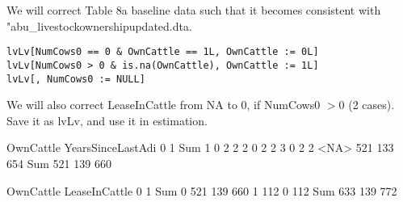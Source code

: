 	We will correct Table 8a baseline data such that it becomes consistent with \textsf{"abu\_livestockownershipupdated.dta}. 
\begin{screen}
\verb+lvLv[NumCows0 == 0 & OwnCattle == 1L, OwnCattle := 0L]+\\
\verb+lvLv[NumCows0 > 0 & is.na(OwnCattle), OwnCattle := 1L]+\\
\verb+lvLv[, NumCows0 := NULL]+
\end{screen}
We will also correct \textsf{LeaseInCattle} from NA to 0, if \textsf{NumCows0} $>0$ (2 cases). Save it as \textsf{lvLv}, and use it in estimation.
\begin{Schunk}
\begin{Soutput}
                 OwnCattle
YearsSinceLastAdi   0   1 Sum
             1      0   2   2
             2      0   2   2
             3      0   2   2
             <NA> 521 133 654
             Sum  521 139 660
\end{Soutput}
\begin{Soutput}
             OwnCattle
LeaseInCattle   0   1 Sum
          0   521 139 660
          1   112   0 112
          Sum 633 139 772
\end{Soutput}
\end{Schunk}



